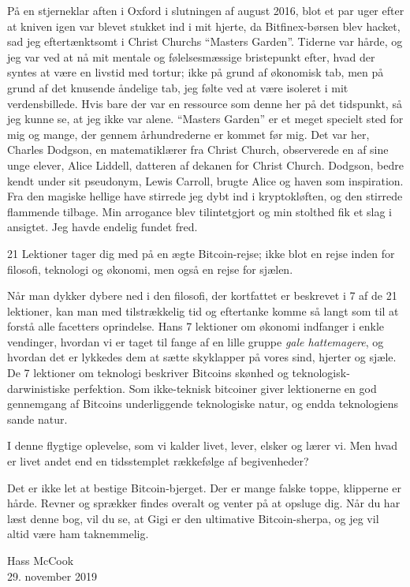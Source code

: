 \documentclass[paper=6in:9in,pagesize=pdftex,headinclude=on,footinclude=on,12pt]{scrbook}
\begin{document}
På en stjerneklar aften i Oxford i slutningen af august 2016, blot et par uger efter at kniven igen var blevet stukket ind i mit hjerte, da Bitfinex-børsen blev hacket, sad jeg eftertænktsomt i Christ Churchs \enquote{Masters Garden}. Tiderne var hårde, og jeg var ved at nå mit mentale og følelsesmæssige bristepunkt efter, hvad der syntes at være en livstid med tortur; ikke på grund af økonomisk tab, men på grund af det knusende åndelige tab, jeg følte ved at være isoleret i mit verdensbillede. Hvis bare der var en ressource som denne her på det tidspunkt, så jeg kunne se, at jeg ikke var alene. \enquote{Masters Garden} er et meget specielt sted for mig og mange, der gennem århundrederne er kommet før mig. Det var her, Charles Dodgson, en matematiklærer fra Christ Church, observerede en af sine unge elever, Alice Liddell, datteren af dekanen for Christ Church. Dodgson, bedre kendt under sit pseudonym, Lewis Carroll, brugte Alice og haven som inspiration. Fra den magiske hellige have stirrede jeg dybt ind i kryptokløften, og den stirrede flammende tilbage. Min arrogance blev tilintetgjort og min stolthed fik et slag i ansigtet. Jeg havde endelig fundet fred.

21 Lektioner tager dig med på en ægte Bitcoin-rejse; ikke blot en rejse inden for filosofi, teknologi og økonomi, men også en rejse for sjælen.

Når man dykker dybere ned i den filosofi, der kortfattet er beskrevet i 7 af de 21 lektioner, kan man med tilstrækkelig tid og eftertanke komme så langt som til at forstå alle facetters oprindelse. Hans 7 lektioner om økonomi indfanger i enkle vendinger, hvordan vi er taget til fange af en lille gruppe \textit{gale hattemagere}, og hvordan det er lykkedes dem at sætte skyklapper på vores sind, hjerter og sjæle. De 7 lektioner om teknologi beskriver Bitcoins skønhed og teknologisk-darwinistiske perfektion. Som ikke-teknisk bitcoiner giver lektionerne en god gennemgang af Bitcoins underliggende teknologiske natur, og endda teknologiens sande natur.

I denne flygtige oplevelse, som vi kalder livet, lever, elsker og lærer vi. Men hvad er livet andet end en tidsstemplet rækkefølge af begivenheder?

Det er ikke let at bestige Bitcoin-bjerget. Der er mange falske toppe, klipperne er hårde. Revner og sprækker findes overalt og venter på at opsluge dig. Når du har læst denne bog, vil du se, at Gigi er den ultimative Bitcoin-sherpa, og jeg vil altid være ham taknemmelig.\begin{flushright} Hass McCook \\ 29. november 2019 \end{flushright}
\end{document}
